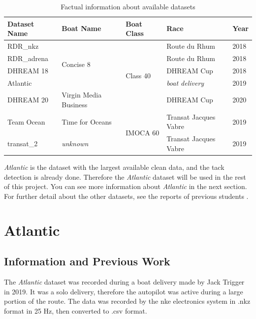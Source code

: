 \documentclass[12pt,twoside]{report}
\begin{document}
\begin{table}[h]
\centering
\begin{tabular}{|l|l|l|l|l|}
\hline
\textbf{Dataset Name} & \textbf{Boat Name}         & \textbf{Boat Class}       & \textbf{Race}          & \textbf{Year} \\ \hline
RDR\_nkz              & \multirow{4}{*}{Concise 8} & \multirow{5}{*}{Class 40} & Route du Rhum          & 2018          \\ \cline{1-1} \cline{4-5} 
RDR\_adrena           &                            &                           & Route du Rhum          & 2018          \\ \cline{1-1} \cline{4-5} 
DHREAM 18             &                            &                           & DHREAM Cup             & 2018          \\ \cline{1-1} \cline{4-5} 
Atlantic              &                            &                           & \textit{boat delivery} & 2019          \\ \cline{1-2} \cline{4-5} 
DHREAM 20             & Virgin Media Business      &                           & DHREAM Cup             & 2020          \\ \hline
Team Ocean            & Time for Oceans            & \multirow{2}{*}{IMOCA 60} & Transat Jacques Vabre  & 2019          \\ \cline{1-2} \cline{4-5} 
transat\_2            & \textit{unknown}           &                           & Transat Jacques Vabre  & 2019          \\ \hline
\end{tabular}
\caption{Factual information about available datasets}
\label{tab:datasets-factual}
\end{table}

\textit{Atlantic} is the dataset with the largest available clean data, and the tack detection is already done. Therefore the \textit{Atlantic} dataset will be used in the rest of this project. You can see more information about \textit{Atlantic} in the next section. For further detail about the other datasets, see the reports of previous students \cite{roman, stan, birk, charles}. 

\section{Atlantic}
\subsection{Information and Previous Work}
The \textit{Atlantic} dataset was recorded during a boat delivery made by Jack Trigger in 2019. It was a solo delivery, therefore the autopilot was active during a large portion of the route. The data was recorded by the nke electronics system in .nkz format in 25 Hz, then converted to .csv format.
\end{document}
